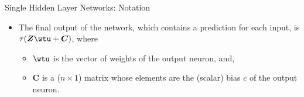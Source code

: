\begin{vbframe}{Single Hidden Layer Networks: Notation}
\framebreak

  \begin{itemize}
    \vspace{15mm}
    \item The final output of the network, which contains a prediction for each input, is $\tau(\bm{Z}\wtu + \bm{C})$, where
      \begin{itemize}
        \vspace{2mm}
        \item $\wtu$ is the vector of weights of the output neuron, and,
        \vspace{2mm}
        \item $\bm{C}$ is a ($n \times 1$) matrix whose elements are the (scalar) bias $c$ of the output neuron.
      \end{itemize}
  \end{itemize}
\end{vbframe}
\endlecture
